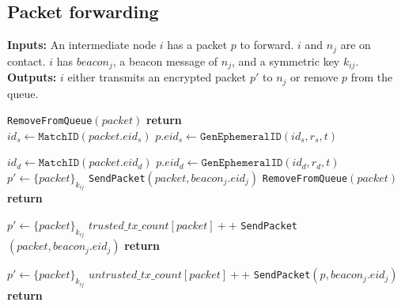 \documentclass[11pt]{article}
\begin{document}
\subsection{Packet forwarding}
\begin{framed}
\noindent
\textbf{Inputs:} An intermediate node $i$ has a packet $p$ to forward. $i$ and $n_j$ are on contact.  $i$ has $beacon_j$, a beacon message of $n_j$, and a symmetric key $k_{ij}$.	\\

\noindent
\textbf{Outputs:} $i$ either transmits an encrypted packet $p'$ to $n_j$ or remove $p$ from the queue.\\

\begin{algorithmic}[1]
      \State \texttt{RemoveFromQueue}$(packet)$
  	  \State \textbf{return}
    \EndIf	\\


        \State $id_s \leftarrow \texttt{MatchID}(packet.eid_s)$      
        \State $p.eid_s \leftarrow \texttt{GenEphemeralID}(id_s, r_s, t) $
      \EndIf     

        \State $id_d \leftarrow \texttt{MatchID}(packet.eid_d)$      
        \State $p.eid_d \leftarrow \texttt{GenEphemeralID}(id_d, r_d, t) $
      \EndIf     
    \EndIf	\\
    
      \State $p' \leftarrow \{packet\}_{k_{ij}}$
      \State \texttt{SendPacket}$(packet, beacon_j.eid_j)$
      \State \texttt{RemoveFromQueue}$(packet)$
      \State \textbf{return}

      \State $p' \leftarrow \{packet\}_{k_{ij}}$
      \State $trusted\_tx\_count[packet]++$
      \State \texttt{SendPacket}$(packet, beacon_j.eid_j)$
      \State \textbf{return}

        \State $p' \leftarrow \{packet\}_{k_{ij}}$
        \State $untrusted\_tx\_count[packet]++$
        \State \texttt{SendPacket}$(p, beacon_j.eid_j)$
        \State \textbf{return}
      \EndIf
    \EndIf
    

\end{algorithmic}
\end{framed}
\end{document}
